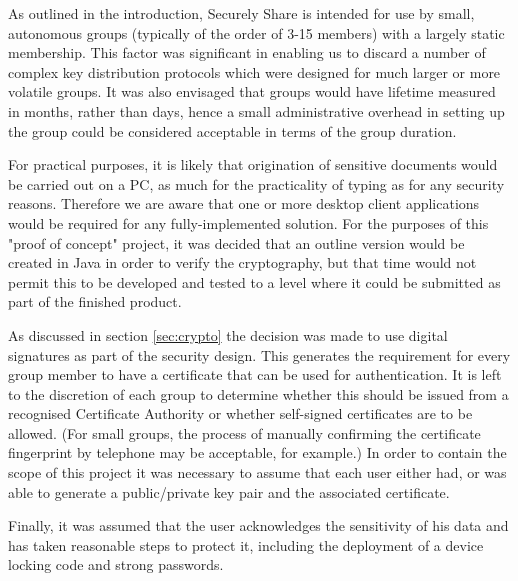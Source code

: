 As outlined in the introduction, Securely Share is intended for use by small, autonomous groups (typically of the order of 3-15 members) with a largely static membership.  This factor was significant in enabling us to discard a number of complex key distribution protocols which were designed for much larger or more volatile groups.  It was also envisaged that groups would have lifetime measured in months, rather than days, hence a small administrative overhead in setting up the group could be considered acceptable in terms of the group duration. 

For practical purposes, it is likely that origination of sensitive documents would be carried out on a PC, as much for the practicality of typing as for any security reasons.  Therefore we are aware that one or more desktop client applications would be required for any fully-implemented solution.  For the purposes of this "proof of concept" project, it was decided that an outline version would be created in Java in order to verify the cryptography, but that time would not permit this to be developed and tested to a level where it could be submitted as part of the finished product.  

As discussed in section \ref{sec:crypto} the decision was made to use digital signatures as part of the security design. This generates the requirement for every group member to have a certificate that can be used for authentication. It is left to the discretion of each group to determine  whether this should be issued from a recognised Certificate Authority or whether self-signed certificates are to be allowed.  (For small groups, the process of manually confirming the certificate fingerprint by telephone may be acceptable, for example.)  In order to contain the scope of this project it was necessary to assume that each user either had, or was able to generate a public/private key pair and the associated certificate.  

Finally, it was assumed that the user acknowledges the sensitivity of his data and has taken reasonable steps to protect it, including the deployment of a device locking code and strong passwords.  

